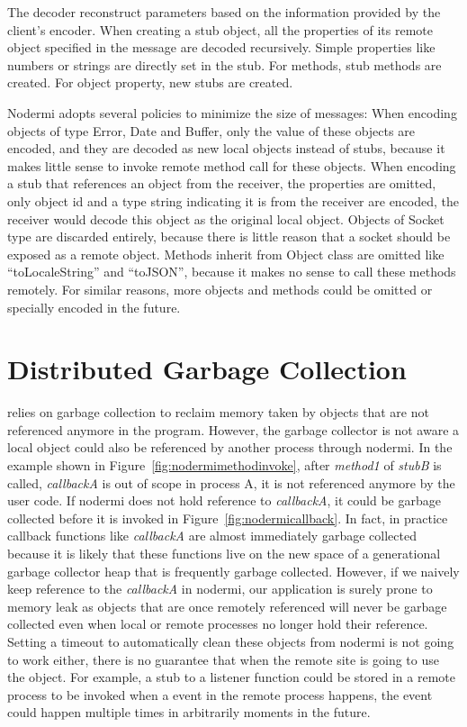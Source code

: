 The decoder reconstruct parameters based on the information provided by the client's encoder.
When creating a stub object,
all the properties of its remote object specified in the message 
are decoded recursively.
Simple properties like numbers or strings are directly set in the stub.
For methods, stub methods are created. 
For object property, new stubs are created.

Nodermi adopts several policies to minimize the size of messages:
When encoding objects of type Error, Date and Buffer,
only the value of these objects are encoded,
and they are decoded as new local objects instead of stubs,
because it makes little sense to invoke remote method call for these objects.
When encoding a stub that references an object from the receiver,
the properties are omitted, only object id and a type string indicating 
it is from the receiver are encoded,
the receiver would decode this object as the original local object.
Objects of Socket type are discarded entirely, because
there is little reason that a socket should be exposed as a remote object.
Methods inherit from Object class are omitted like ``toLocaleString''
and ``toJSON'', because it makes no sense to call these methods remotely.
For similar reasons, 
more objects and methods could be omitted or specially encoded
in the future.


\section{Distributed Garbage Collection}
\js{} relies on garbage collection to reclaim memory taken by
objects that are not referenced anymore in the program.
However, the garbage collector is not aware a local object
could also be referenced by another process through nodermi.
In the example shown in Figure~\ref{fig:nodermimethodinvoke},
after \emph{method1} of \emph{stubB} is called,
\emph{callbackA} is out of scope in process A,
it is not referenced anymore by the user code.
If nodermi does not hold reference to \emph{callbackA},
it could be garbage collected before it is invoked in Figure~\ref{fig:nodermicallback}.
In fact, in practice callback functions like \emph{callbackA} are almost
immediately garbage collected because it is likely that these functions
live on the new space of a generational garbage collector heap that is frequently
garbage collected.
However, if we naively keep reference to the \emph{callbackA} in nodermi,
our application is surely prone to memory leak as objects that are once remotely
referenced
will never be garbage collected even when local or remote processes no longer hold their reference.
Setting a timeout to automatically clean these objects from nodermi
 is not going to work either,
there is no guarantee that when the remote site is going to use the object.
For example,
a stub to a listener function could be stored in a remote process
to be invoked when a event in the remote process happens,
the event could happen multiple times in arbitrarily moments in the future.


